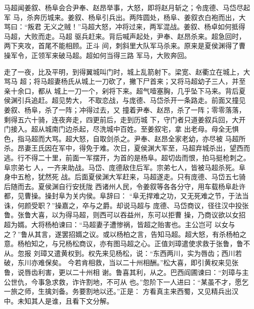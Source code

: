 马超闻姜叙、杨阜会合尹奉、赵昂举事，大怒，即将赵月斩之；令庞德、马岱尽起军
马，杀奔历城来。姜叙、杨阜引兵出。两阵圆处，杨阜、姜叙衣白袍而出，大骂曰：“叛君
无义之贼！”马超大怒，冲将过来，两军混战。姜叙、杨卓如何抵得马超，大败而走。马超
驱兵赶来。背后喊声起处，尹奉、赵昂杀来。超急回时，两下夹攻，首尾不能相顾。正斗
间，刺斜里大队军马杀来。原来是夏侯渊得了曹操军令，正领军来破马超。超如何当得三路
军马，大败奔回。

走了一夜，比及平明，到得翼城叫门时，城上乱箭射下。梁宽、赵衢立在城上，大骂马
超；将马超妻杨氏从城上一刀砍了，撇下尸首来；又将马超幼子三人，并至亲十余口，都从
城上一刀一个，剁将下来。超气噎塞胸，几乎坠下马来。背后夏侯渊引兵追赶。超见势大，
不取恋战，与庞德、马岱杀开一条路走。前面又撞见姜叙、杨阜，杀了一阵；冲得过去，又
撞着尹奉、赵昂，杀了一阵；零零落落，剩得五六十骑，连夜奔走，四更前后，走到历城
下，守门者只道姜叙兵回，大开门接入。超从城南门边杀起，尽洗城中百姓。至姜叙宅，拿
出老母。母全无惧色，指马超而大骂。超大怒，自取剑杀之。尹奉、赵昂全家老幼，亦尽被
马超所杀。昂妻王氏因在军中，得免于难。次日，夏侯渊大军至，马超弃城杀出，望西而
逃。行不得二十里，前面一军摆开，为首的是杨阜。超切齿而恨，拍马挺枪刺之。阜宗弟七
人，一齐来助战。马岱、庞德敌住后军。宗弟七人，皆被马超杀死。阜身中五枪，犹然死
战。后面夏侯渊大军赶来，马超遂走。只有庞德、马岱五七骑后随而去。夏侯渊自行安抚陇
西诸州人民，令姜叙等各各分守，用车载杨阜赴许都，见曹操。操封阜为关内侯。阜辞曰：
“阜无捍难之功，又无死难之节，于法当诛，何颜受职？”操嘉之，卒与之爵。却说马超与
庞德、马岱商议，径往汉中投张鲁。张鲁大喜，以为得马超，则西可以吞益州，东可以拒曹
操，乃商议欲以女招超为婿。大将杨柏谏曰：“马超妻子遭惨祸，皆超之贻害也。主公岂可
以女与之？”鲁从其言，遂罢招婿之议。或以杨柏之言，告知马超。超大怒，有杀杨柏之
意。杨柏知之，与兄杨松商议，亦有图马超之心。正值刘璋遣使求救于张鲁，鲁不从。忽报
刘璋又遣黄权到。权先来见杨松，说：“东西两川，实为唇齿；西川若破，东川亦难保矣。
今若肯相救，当以二十州相酬。”松大喜，即引黄权来见张鲁，说唇齿利害，更以二十州相
谢。鲁喜其利，从之。巴西阎圃谏曰：“刘璋与主公世仇，今事急求救，诈许割地，不可从
也。”忽阶下一人进曰：“某虽不才，愿乞一旅之师，生擒刘备。务要割地以还。”正是：
方看真主来西蜀，又见精兵出汉中。未知其人是谁，且看下文分解。